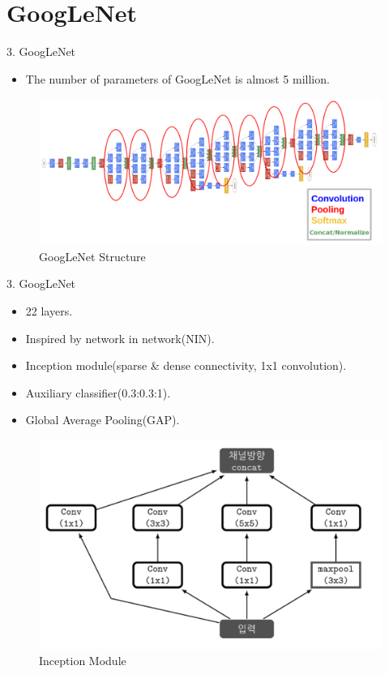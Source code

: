 \documentclass{beamer}
\begin{document}
\section{GoogLeNet}
\begin{frame}{3. GoogLeNet}
	\vspace{10pt}
	\begin{itemize}
		\item The number of parameters of GoogLeNet\cite{googlenet} is almost 5 million.
	\end{itemize}
	\vspace{10pt}
	\begin{figure}[h]		
		\centering
		\includegraphics[scale=0.5]{./google/googlenet.PNG}
		\caption{GoogLeNet Structure}
		\label{GoogLeNetstr}
	\end{figure}
\end{frame}


\begin{frame}{3. GoogLeNet}
	\begin{itemize}
		\item 22 layers.
		\item Inspired by network in network(NIN)\cite{nin}.
		\item Inception module(sparse \& dense connectivity, 1x1 convolution).
		\item Auxiliary classifier(0.3:0.3:1).
		\item Global Average Pooling(GAP).
	\end{itemize}
	\vspace{10pt}
	\begin{figure}[h]		
		\centering
		\includegraphics[scale=0.32]{./google/inception_module.PNG}
		\caption{Inception Module}
		\label{inception}
	\end{figure}
\end{frame}
\end{document}
